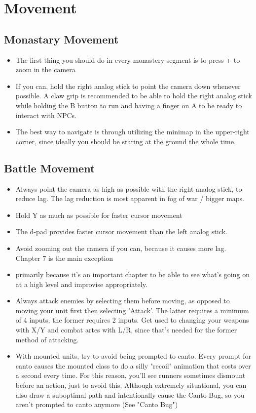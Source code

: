 \section*{Movement}

\subsection*{Monastary Movement}
\begin{itemize}
\item The first thing you should do in every monastery segment is to press + to zoom in the camera
\item If you can, hold the right analog stick to point the camera down whenever possible. A claw grip is recommended to be able to hold the right analog stick while holding the B button to run and having a finger on A to be ready to interact with NPCs.
\item The best way to navigate is through utilizing the minimap in the upper-right corner, since ideally you should be staring at the ground the whole time.
\end{itemize}

\subsection*{Battle Movement}
\begin{itemize}
\item Always point the camera as high as possible with the right analog stick, to reduce lag. The lag reduction is most apparent in fog of war / bigger maps.
\item Hold Y as much as possible for faster cursor movement
\item The d-pad provides faster cursor movement than the left analog stick.
\item Avoid zooming out the camera if you can, because it causes more lag. Chapter 7 is the main exception \item primarily because it's an important chapter to be able to see what's going on at a high level and improvise appropriately.
\item Always attack enemies by selecting them before moving, as opposed to moving your unit first then selecting 'Attack'. The latter requires a minimum of 4 inputs, the former requires 2 inputs. Get used to changing your weapons with X/Y and combat artes with L/R, since that's needed for the former method of attacking.
\item With mounted units, try to avoid being prompted to canto. Every prompt for canto causes the mounted class to do a silly "recoil" animation that costs over a second every time. For this reason, you'll see runners sometimes dismount before an action, just to avoid this. Although extremely situational, you can also draw a suboptimal path and intentionally cause the Canto Bug, so you aren't prompted to canto anymore (See "Canto Bug")
\end{itemize}

